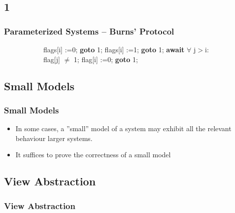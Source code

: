 \documentclass[handout]{beamer}
\begin{document}
\subsection*{1}
\begin{frame}
  \frametitle{Parameterized Systems -- Burns' Protocol}
  \begin{figure}
    \begin{example}
      \begin{subfigure}[b]{0.49\textwidth}
        \begin{algorithmic}
          \footnotesize
          \State flags[i] :=0;
           \State \textbf{goto} 1;
          \EndIf
          \State flags[i] :=1;
           \State \textbf{goto} 1;
          \EndIf
          \State \textbf{await} $\forall$ j$>$i: flag[j] $\neq$ 1;
          \State flag[i] :=0; \textbf{goto} 1;
        \end{algorithmic}
      \end{subfigure}
      \begin{subfigure}[b]{0.49\textwidth}
        \burns
      \end{subfigure}
    \end{example}
  \end{figure}
\end{frame}


\subsection{Small Models}
\begin{frame}
  \frametitle{Small Models}
  \begin{itemize}
  \item
    In some cases, a ''small'' model of a system may exhibit all the relevant behaviour larger systems. %
  \item
    It suffices to prove the correctness of a small model
  \end{itemize}
\end{frame}

\subsection{View Abstraction}
\begin{frame}
  \frametitle{View Abstraction} %
  \begin{exampleblock}{}
    \abstraction
  \end{exampleblock}
\end{frame}
\end{document}
